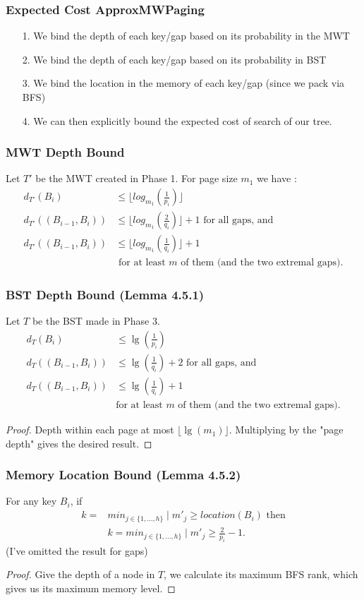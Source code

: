 \documentclass{beamer}
\theoremstyle{plain}
\begin{document}
\begin{frame} \frametitle{Expected Cost ApproxMWPaging} \label{45}
\begin{itemize}
\item[1.] We bind the depth of each key/gap based on its probability in the MWT 
\item[2.] We bind the depth of each key/gap based on its probability in BST
\item[3.] We bind the location in the memory of each key/gap (since we pack via BFS)
\item[4.] We can then explicitly bound the expected cost of search of our tree.
\end{itemize}
\end{frame}

\begin{frame}\frametitle{MWT Depth Bound}
Let $T'$ be the MWT created in Phase 1. For page size $m_1$ we have \cite{bose2009efficient}:
\begin{align*} d_{T'}(B_i) &\leq \lfloor log_{m_1}(\frac{1}{p_i}) \rfloor \\
d_{T'}((B_{i-1},B_i)) &\leq \lfloor log_{m_1}(\frac{2}{q_i}) \rfloor + 1 \text{ for all gaps, and}\\
d_{T'}((B_{i-1},B_i)) &\leq \lfloor log_{m_1}(\frac{1}{q_i}) \rfloor + 1 \\ 
&\text{ for at least $m$ of them (and the two extremal gaps).}
 \end{align*}
\end{frame}

\begin{frame}\frametitle{BST Depth Bound (Lemma 4.5.1)}
Let $T$ be the BST made in Phase 3.
\begin{align*} 
d_T(B_i) &\leq \lg(\frac{1}{p_i}) \\
d_T((B_{i-1},B_i)) &\leq \lg(\frac{1}{q_i}) + 2 \text{ for all gaps, and} \\
d_T((B_{i-1},B_i)) &\leq \lg(\frac{1}{q_i}) + 1 \\
&\text{for at least  $m$ of them (and the two extremal gaps).}
\end{align*}
\begin{proof}
Depth within each page at most $\lfloor \lg(m_1) \rfloor$. Multiplying by the "page depth" gives the desired result.
\end{proof}

\end{frame}

\begin{frame}\frametitle{Memory Location Bound (Lemma 4.5.2)}
For any key $B_i$, if
\begin{align*}
k=&min_{j \in \{1, ..., h\}} \mid m'_j \geq location(B_i) \text{ then} \\
&k=min_{j \in \{1, ..., h\}} \mid m'_j \geq \frac{2}{p_i}-1.
\end{align*}
(I've omitted the result for gaps)
\begin{proof}
Give the depth of a node in $T$, we calculate its maximum BFS rank, which gives us its maximum memory level.
\end{proof}
\end{frame}
\end{document}
